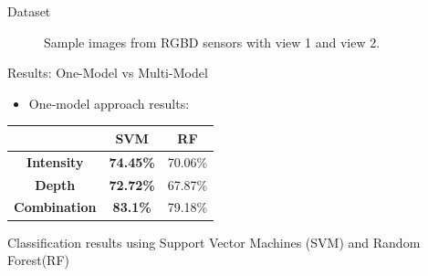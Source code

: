 \documentclass[final,hyperref={pdfpagelabels=false}]{beamer}
\begin{document}
\begin{frame}[t]
\begin{columns}[t]
\begin{column}{.465\textwidth}
\begin{block}{Dataset \cite{twinanda2015data}}
\begin{figure}
\caption{Sample images from RGBD sensors with view 1 and view 2.}
\label{fig:cameraViews}
\end{figure}

\end{block}



\begin{block}{Results: One-Model vs Multi-Model}

\begin{itemize}
\item One-model approach results:
\end{itemize}

\begin{table}[h]
\centering
\begin{tabular}{|c|c|c|}
\hline
                     & \textbf{SVM}     & \textbf{RF} \\ \hline
\textbf{Intensity}   & \textbf{74.45\%} & 70.06\%     \\ \hline
\textbf{Depth}       & \textbf{72.72\%} & 67.87\%     \\ \hline
\textbf{Combination} & \textbf{83.1\%}  & 79.18\%     \\ \hline
\end{tabular}
\label{table:oneModelResults}
\end{table}
\begin{center}
{\small  Classification results using Support Vector Machines (SVM) and Random Forest(RF)}
\end{center}


\end{block}
\end{column}
\end{columns}
\end{frame}
\end{document}
